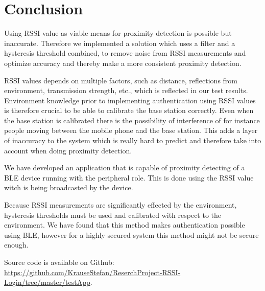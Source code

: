 \section{Conclusion}
Using RSSI value as viable means for proximity detection is possible but inaccurate. Therefore we implemented a solution which uses a filter and a hysteresis threshold combined, to remove noise from RSSI measurements and optimize accuracy and thereby make a more consistent proximity detection.

RSSI values depends on multiple factors, such as distance, reflections from environment, transmission strength, etc., which is reflected in our test results.
Environment knowledge prior to implementing authentication using RSSI values is therefore crucial to be able to calibrate the base station correctly. 
Even when the base station is calibrated there is the possibility of interference of for instance people moving between the mobile phone and the base station. 
This adds a layer of inaccuracy to the system which is really hard to predict and therefore take into account when doing proximity detection.

We have developed an application that is capable of proximity detecting of a BLE device running with the peripheral role. This is done using the RSSI value witch is being broadcasted by the device.

Because RSSI measurements are significantly effected by the environment, hysteresis thresholds must be used and calibrated with respect to the environment.
We have found that this method makes authentication possible using BLE, however for a highly secured system this method might not be secure enough.

Source code is available on Github:
\url{https://github.com/KrauseStefan/ReserchProject-RSSI-Login/tree/master/testApp}.

%


